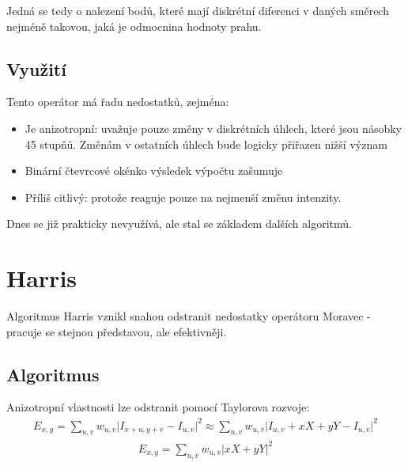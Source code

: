 Jedná se tedy o nalezení bodů, které mají diskrétní diferenci v daných směrech nejméně takovou, jaká je odmocnina
hodnoty prahu.

\subsection{Využití}
Tento operátor má řadu nedostatků, zejména:
\begin{itemize}
	\item Je anizotropní: uvažuje pouze změny v diskrétních úhlech, které jsou násobky 45 stupňů. Změnám v ostatních úhlech bude logicky přiřazen nižší význam
	\item Binární čtevrcové okénko výsledek výpočtu zašumuje
	\item Příliš citlivý: protože reaguje pouze na nejmenší změnu intenzity.
\end{itemize}

Dnes se již prakticky nevyužívá, ale stal se základem dalších algoritmů.

\section{Harris}
		
Algoritmus Harris \cite{harris1988combined} vznikl snahou odstranit nedostatky operátoru Moravec - pracuje se stejnou představou, ale efektivněji.

\subsection{Algoritmus}	
\label{harris_alg}

Anizotropní vlastnosti lze odstranit pomocí Taylorova rozvoje:
\begin{align}	
E_{x,y} = \sum_{u,v} w_{u,v} \lvert I_{x+u, y+v} - I_{u,v} \rvert^2
\approx \sum_{u,v} w_{u,v} \lvert I_{u, v} + xX + yY  - I_{u,v} \rvert^2
\end{align}
\begin{align}
E_{x,y} = \sum_{u,v} w_{u,v} \lvert xX + yY \rvert^2
\end{align}

